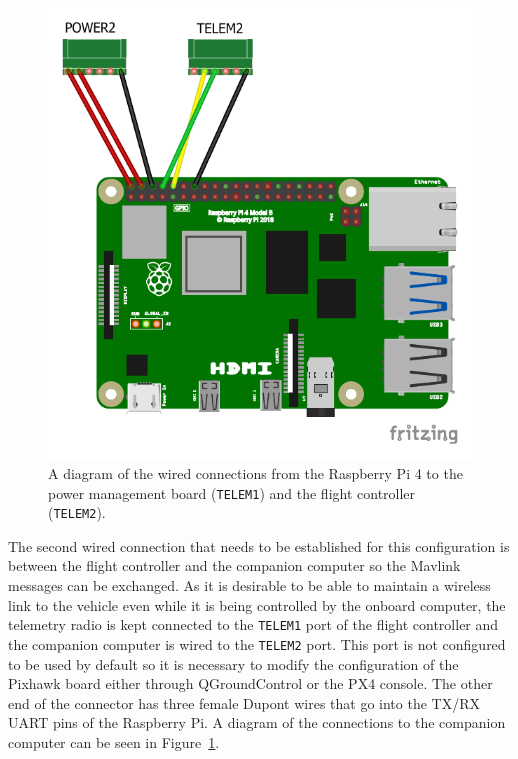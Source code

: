 \begin{figure}
  \centering
  \includegraphics[keepaspectratio]{img/wiring-diagram.pdf}
  \caption{A diagram of the wired connections from the Raspberry Pi 4 to the power management board (\verb|TELEM1|) and the flight controller (\verb|TELEM2|).}\label{fig:wiring}
\end{figure}
The second wired connection that needs to be established for this configuration is between the flight controller and the companion computer so the Mavlink messages can be exchanged.
As it is desirable to be able to maintain a wireless link to the vehicle even while it is being controlled by the onboard computer, the telemetry radio is kept connected to the \verb|TELEM1| port of the flight controller and the companion computer is wired to the \verb|TELEM2| port.
This port is not configured to be used by default so it is necessary to modify the configuration of the Pixhawk board either through QGroundControl  or the PX4 console. 
The other end of the connector has three female Dupont wires that go into the TX/RX UART pins of the Raspberry Pi.
A diagram of the connections to the companion computer can be seen in Figure~\ref{fig:wiring}.

